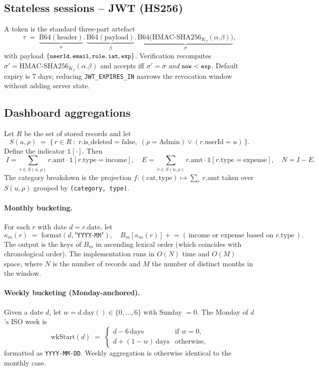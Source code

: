 \documentclass[11pt,a4paper]{article}
\newcommand{\code}[1]{\texttt{\small #1}}
\begin{document}
\subsection{Stateless sessions -- JWT (HS256)}
A token is the standard three-part artefact
\[
\tau \;=\;
\underbrace{\mathrm{B64}(\text{header})}_{\alpha}.\,
\underbrace{\mathrm{B64}(\text{payload})}_{\beta}.\,
\underbrace{\mathrm{B64}\bigl(\mathrm{HMAC\text{-}SHA256}_{K_J}(\alpha . \beta)\bigr)}_{\sigma},
\]
with payload $\{\code{userId}, \code{email}, \code{role}, \code{iat}, \code{exp}\}$.
Verification recomputes
$\sigma' = \mathrm{HMAC\text{-}SHA256}_{K_J}(\alpha . \beta)$ and
accepts iff $\sigma'=\sigma$ \emph{and} $\code{now} < \code{exp}$.
Default expiry is 7 days; reducing \code{JWT\_EXPIRES\_IN} narrows the
revocation window without adding server state.

\subsection{Dashboard aggregations}
Let $R$ be the set of stored records and let
\[
S(u,\rho) \;=\;
\bigl\{\,r \in R \;:\; r.\text{is\_deleted}=\mathrm{false},\;
(\rho = \text{Admin}) \lor (r.\text{userId} = u)\,\bigr\}.
\]
Define the indicator $\mathbb{1}[\cdot]$. Then
\[
\boxed{\;
I = \!\!\sum_{r \in S(u,\rho)} r.\text{amt}\cdot \mathbb{1}[r.\text{type}=\text{income}], \quad
E = \!\!\sum_{r \in S(u,\rho)} r.\text{amt}\cdot \mathbb{1}[r.\text{type}=\text{expense}], \quad
N = I - E.\;}
\]
The category breakdown is the projection
$f:(\text{cat},\text{type}) \mapsto \sum_{r}\,r.\text{amt}$ taken over
$S(u,\rho)$ grouped by \code{(category, type)}.

\paragraph{Monthly bucketing.} For each $r$ with date $d = r.\text{date}$,
let
\[
\kappa_m(r) \;=\; \mathrm{format}(d, \texttt{"YYYY-MM"}),
\quad
B_m[\kappa_m(r)] \mathrel{+}= (\,\text{income or expense based on } r.\text{type}\,).
\]
The output is the keys of $B_m$ in ascending lexical order (which
coincides with chronological order). The implementation runs in
$O(N)$ time and $O(M)$ space, where $N$ is the number of records and
$M$ the number of distinct months in the window.

\paragraph{Weekly bucketing (Monday-anchored).} Given a date $d$, let
$w = d.\text{day}() \in \{0,\dots,6\}$ with Sunday $= 0$. The Monday
of $d$'s ISO week is
\[
\mathrm{wkStart}(d) \;=\;
\begin{cases}
d - 6\,\text{days} & \text{if } w = 0,\\
d + (1-w)\,\text{days} & \text{otherwise},
\end{cases}
\]
formatted as \code{YYYY-MM-DD}. Weekly aggregation is otherwise
identical to the monthly case.
\end{document}
